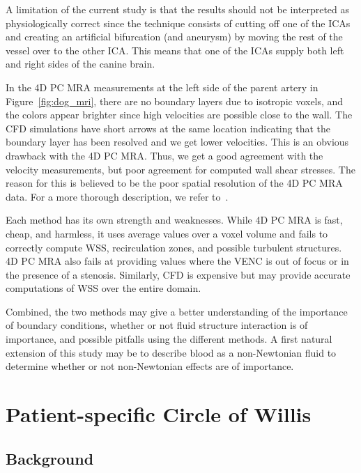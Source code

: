 A limitation of the current study is that the results should not be
interpreted as physiologically correct since the technique consists of
cutting off one of the ICAs and creating an artificial bifurcation
(and aneurysm) by moving the rest of the vessel over to the other
ICA. This means that one of the ICAs supply both left and right sides
of the canine brain.

In the 4D PC MRA measurements at the left side of the parent artery in
Figure~\ref{fig:dog_mri}, there are no boundary layers due to
isotropic voxels, and the colors appear brighter since high velocities
are possible close to the wall.  The CFD simulations have short arrows
at the same location indicating that the boundary layer has been
resolved and we get lower velocities. This is an obvious drawback with
the 4D PC MRA. Thus, we get a good agreement with the velocity
measurements, but poor agreement for computed wall shear stresses. The
reason for this is believed to be the poor spatial resolution of the
4D PC MRA data. For a more thorough description, we refer
to~\cite{JiangJohnsonValen-SendstadEtAl2010}.

Each method has its own strength and weaknesses. While 4D PC MRA is
fast, cheap, and harmless, it uses average values over a voxel volume
and fails to correctly compute WSS, recirculation zones, and possible
turbulent structures. 4D PC MRA also fails at providing values where
the VENC is out of focus or in the presence of a stenosis. Similarly,
CFD is expensive but may provide accurate computations of WSS over the
entire domain.

Combined, the two methods may give a better understanding of the
importance of boundary conditions, whether or not fluid structure
interaction is of importance, and possible pitfalls using the
different methods. A first natural extension of this study may be to
describe blood as a non-Newtonian fluid to determine whether or not
non-Newtonian effects are of importance.

\section{Patient-specific Circle of Willis} \label{cok}

\subsection{Background}


